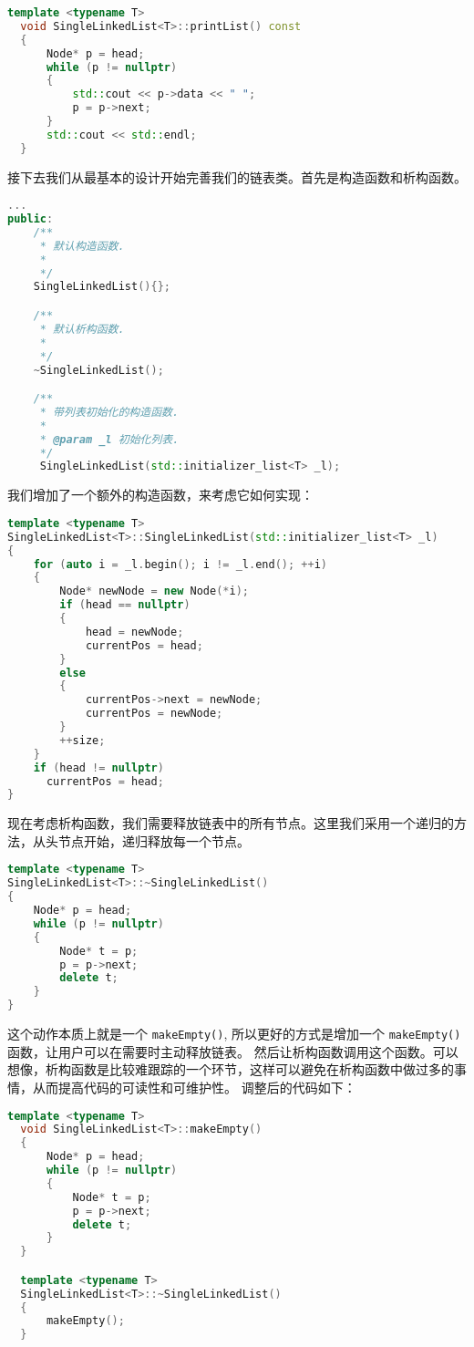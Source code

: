 \documentclass[a4paper]{ctexart}
\theoremstyle{definition}
\theoremstyle{definition}
\begin{document}
\begin{lstlisting}[language=c++]
  template <typename T>
  void SingleLinkedList<T>::printList() const
  {
      Node* p = head;
      while (p != nullptr)
      {
          std::cout << p->data << " ";
          p = p->next;
      }
      std::cout << std::endl;
  }  
\end{lstlisting}

接下去我们从最基本的设计开始完善我们的链表类。首先是构造函数和析构函数。

\begin{lstlisting}[language=c++]
...
public:
    /** 
     * 默认构造函数.
     * 
     */
    SingleLinkedList(){};

    /** 
     * 默认析构函数.
     * 
     */
    ~SingleLinkedList();

    /** 
     * 带列表初始化的构造函数.
     * 
     * @param _l 初始化列表.
     */
     SingleLinkedList(std::initializer_list<T> _l);
\end{lstlisting}

我们增加了一个额外的构造函数，来考虑它如何实现：
\begin{lstlisting}[language=c++]
template <typename T>
SingleLinkedList<T>::SingleLinkedList(std::initializer_list<T> _l)
{
    for (auto i = _l.begin(); i != _l.end(); ++i)
    {
        Node* newNode = new Node(*i);
        if (head == nullptr)
        {
            head = newNode;
            currentPos = head;
        }
        else
        {
            currentPos->next = newNode;
            currentPos = newNode;
        }
        ++size;
    }
    if (head != nullptr)
      currentPos = head;
}
\end{lstlisting}

现在考虑析构函数，我们需要释放链表中的所有节点。这里我们采用一个递归的方法，从头节点开始，递归释放每一个节点。
\begin{lstlisting}[language=c++]
template <typename T>
SingleLinkedList<T>::~SingleLinkedList()
{
    Node* p = head;
    while (p != nullptr)
    {
        Node* t = p;
        p = p->next;
        delete t;
    }
}
\end{lstlisting}

这个动作本质上就是一个 \verb|makeEmpty()|, 所以更好的方式是增加一个 \verb|makeEmpty()| 函数，让用户可以在需要时主动释放链表。
然后让析构函数调用这个函数。可以想像，析构函数是比较难跟踪的一个环节，这样可以避免在析构函数中做过多的事情，从而提高代码的可读性和可维护性。
调整后的代码如下：
\begin{lstlisting}[language=c++]
  template <typename T>
  void SingleLinkedList<T>::makeEmpty()
  {
      Node* p = head;
      while (p != nullptr)
      {
          Node* t = p;
          p = p->next;
          delete t;
      }
  }

  template <typename T>
  SingleLinkedList<T>::~SingleLinkedList()
  {
      makeEmpty();
  }
\end{lstlisting}
  
\end{document}
